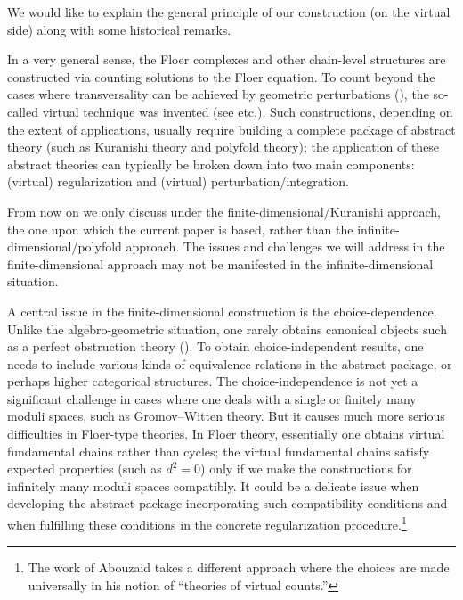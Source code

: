 \documentclass[reqno, 10pt]{amsart}
\numberwithin{equation}{section}
\numberwithin{equation}{section}
\theoremstyle{definition}
\theoremstyle{remark}
\begin{document}
We would like to explain the general principle of our construction (on the virtual side) along with some historical remarks.

In a very general sense, the Floer complexes and other chain-level structures are constructed via counting solutions to the Floer equation. To count beyond the cases where transversality can be achieved by geometric perturbations (\cite{Floer_CMP}\cite{Hofer_Salamon}\cite{Ono_1995}), the so-called virtual technique was invented (see \cite{Li_Tian}\cite{Fukaya_Ono}\cite{FOOO_Kuranishi}\cite{HWZ_book}\cite{Pardon_virtual} etc.). Such constructions, depending on the extent of applications, usually require building a complete package of abstract theory (such as Kuranishi theory and polyfold theory); the application of these abstract theories can typically be broken down into two main components: (virtual) regularization and (virtual) perturbation/integration.



From now on we only discuss under the finite-dimensional/Kuranishi approach, the one upon which the current paper is based, rather than the infinite-dimensional/polyfold approach. The issues and challenges we will address in the finite-dimensional approach may not be manifested in the infinite-dimensional situation.

A central issue in the finite-dimensional construction is the choice-dependence. Unlike the algebro-geometric situation, one rarely obtains canonical objects such as a perfect obstruction theory (\cite{Behrend_Fantechi}). To obtain choice-independent results, one needs to include various kinds of equivalence relations in the abstract package, or perhaps higher categorical structures. The choice-independence is not yet a significant challenge in cases where one deals with a single or finitely many moduli spaces, such as Gromov--Witten theory. But it causes much more serious difficulties in Floer-type theories. In Floer theory, essentially one obtains virtual fundamental chains rather than cycles; the virtual fundamental chains satisfy expected properties (such as $d^2 = 0$) only if we make the constructions for infinitely many moduli spaces compatibly. It could be a delicate issue when developing the abstract package incorporating such compatibility conditions and when fulfilling these conditions in the concrete regularization procedure.\footnote{The work of Abouzaid \cite{Abouzaid_axiomatic} takes a different approach where the choices are made universally in his notion of ``theories of virtual counts.''} 
\end{document}
